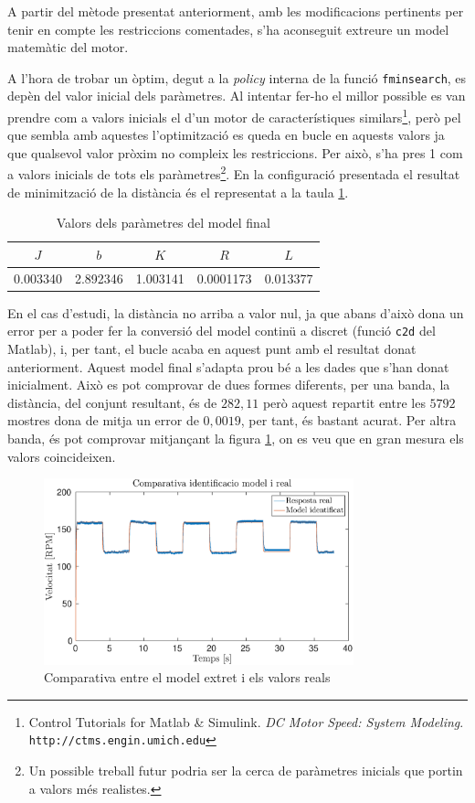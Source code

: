 \documentclass[12pt,a4paper,final,twoside,openright]{report}
\begin{document}
A partir del mètode presentat anteriorment, amb les modificacions pertinents per tenir en compte les restriccions comentades, s'ha aconseguit extreure un model matemàtic del motor.

A l'hora de trobar un òptim, degut a la \textit{policy} interna de la funció \texttt{fminsearch}, es depèn del valor inicial dels paràmetres. Al intentar fer-ho el millor possible es van prendre com a valors inicials el d'un motor de característiques similars\footnote{Control Tutorials for Matlab \& Simulink. \textit{DC Motor Speed: System Modeling}. \texttt{http://ctms.engin.umich.edu}}, però pel que sembla amb aquestes l'optimització es queda en bucle en aquests valors ja que qualsevol valor pròxim no compleix les restriccions. Per això, s'ha pres 1 com a valors inicials de tots els paràmetres\footnote{Un possible treball futur podria ser la cerca de paràmetres inicials que portin a valors més realistes.}. En la configuració presentada el resultat de minimització de la distància és el representat a la taula \ref{tab:modelFinal}. 

\begin{table}[h]
\centering
\begin{tabular}{|c|c|c|c|c|}
\hline
$J$ & $b$ & $K$ & $R$ & $L$\\ \hline
0.003340 & 2.892346 & 1.003141 & 0.0001173 & 0.013377 \\ \hline
\end{tabular}
\caption{Valors dels paràmetres del model final\label{tab:modelFinal}}
\end{table}

En el cas d'estudi, la distància no arriba a valor nul, ja que abans d'això dona un error per a poder fer la conversió del model continü a discret (funció \texttt{c2d} del Matlab), i, per tant, el bucle acaba en aquest punt amb el resultat donat anteriorment. Aquest model final s'adapta prou bé a les dades que s'han donat inicialment. Això es pot comprovar de dues formes diferents, per una banda, la distància, del conjunt resultant, és de $282,11$ però aquest repartit entre les $5792$ mostres dona de mitja un error de $0,0019$, per tant, és bastant acurat. Per altra banda, és pot comprovar mitjançant la figura \ref{fig:comp_model_real}, on es veu que en gran mesura els valors coincideixen.

\begin{figure}[h]
\centering
\includegraphics[width=0.8\textwidth]{Imatges/identificacio.eps}
\caption{Comparativa entre el model extret i els valors reals\label{fig:comp_model_real}}
\end{figure}
\end{document}

